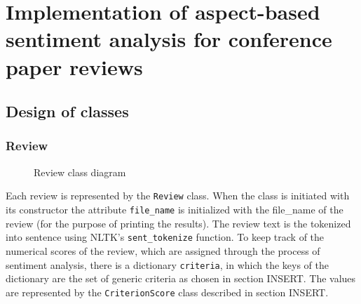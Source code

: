 \chapter{Implementation of aspect-based sentiment analysis for conference paper reviews}
\section{Design of classes}

 \subsection{Review}
 \begin{figure}[H]
\centering
{}

\caption{Review class diagram}
\label{img:review}
\end{figure}

Each review is represented by the \texttt{Review} class. When the class is initiated with its constructor the attribute \texttt{file\_name} is initialized with the file\_name of the review (for the purpose of printing the results). The review text is the tokenized into sentence using NLTK's \texttt{sent\_tokenize} function. To keep track of the numerical scores of the review, which are assigned through the process of sentiment analysis, there is a dictionary \texttt{criteria}, in which the keys of the dictionary are the set of generic criteria as chosen in section INSERT. The values are represented by the \texttt{CriterionScore} class described in section INSERT.

